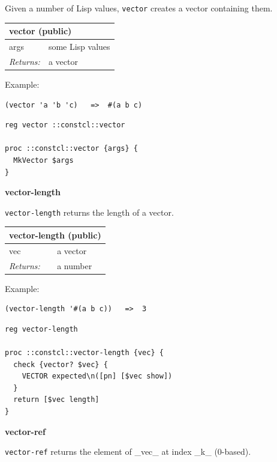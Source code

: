 \documentclass[twoside,9pt]{report}
\begin{document}
Given a number of Lisp values, \texttt{vector} creates a vector containing them.

\begin{tabular}{ |l l| }
\hline
\multicolumn{2}{|l|}{vector (public)} \\
\hline
args & some Lisp values \\
\textit{Returns:} & a vector \\
\hline
\end{tabular}


Example:

\noindent\makebox[\linewidth]{\rule{\linewidth}{0.4pt}}
\begin{lstlisting}
(vector 'a 'b 'c)   =>  #(a b c)
\end{lstlisting}
\noindent\makebox[\linewidth]{\rule{\linewidth}{0.4pt}}
\noindent\makebox[\linewidth]{\rule{\linewidth}{0.4pt}}
\begin{lstlisting}
reg vector ::constcl::vector
 
proc ::constcl::vector {args} {
  MkVector $args
}
\end{lstlisting}
\noindent\makebox[\linewidth]{\rule{\linewidth}{0.4pt}}

\textbf{vector-length}


\texttt{vector-length} returns the length of a vector.

\begin{tabular}{ |l l| }
\hline
\multicolumn{2}{|l|}{vector-length (public)} \\
\hline
vec & a vector \\
\textit{Returns:} & a number \\
\hline
\end{tabular}


Example:

\noindent\makebox[\linewidth]{\rule{\linewidth}{0.4pt}}
\begin{lstlisting}
(vector-length '#(a b c))   =>  3
\end{lstlisting}
\noindent\makebox[\linewidth]{\rule{\linewidth}{0.4pt}}
\noindent\makebox[\linewidth]{\rule{\linewidth}{0.4pt}}
\begin{lstlisting}
reg vector-length
 
proc ::constcl::vector-length {vec} {
  check {vector? $vec} {
    VECTOR expected\n([pn] [$vec show])
  }
  return [$vec length]
}
\end{lstlisting}
\noindent\makebox[\linewidth]{\rule{\linewidth}{0.4pt}}

\textbf{vector-ref}


\texttt{vector-ref} returns the element of \_vec\_ at index \_k\_ (0-based).
\end{document}
